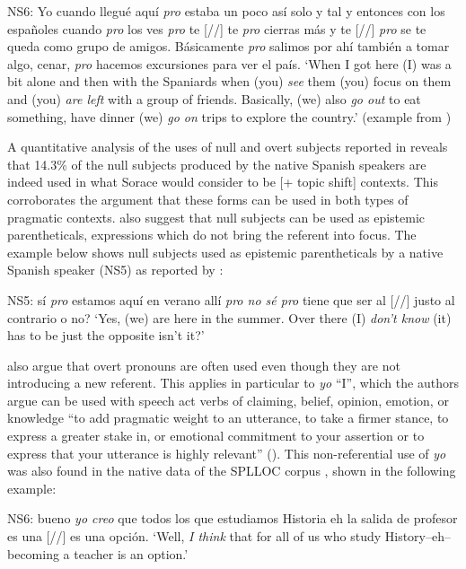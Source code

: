 \documentclass[output=paper]{langscibook}
\begin{document}
\ea\label{ex:dominguez:9}
NS6: Yo cuando llegué aquí \textit{pro} estaba un poco así solo y tal y entonces con los españoles  cuando \textit{pro} los ves  \textit{pro} te [//] te \textit{pro} cierras más y te [//] \textit{pro} se te queda como grupo de amigos. Básicamente \textit{pro} salimos por ahí también a tomar algo, cenar, \textit{pro} hacemos excursiones para ver el país.
\glt ‘When I got here (I) was a bit alone and then with the Spaniards when (you) \textit{see} them (you) focus on them and (you) \textit{are left} with a group of friends. Basically, (we) also \textit{go out} to eat something, have dinner (we) \textit{go on} trips to explore the country.’ (example from \citealt{Dominguez2013})
\z

A quantitative analysis of the uses of null and overt subjects reported in \citet{Dominguez2013} reveals that 14.3\% of the null subjects produced by the native Spanish speakers are indeed used in what Sorace would consider to be [+ topic shift] contexts. This corroborates the argument that these forms can be used in both types of pragmatic contexts. \citet{LubbersBlackwell2009} also suggest that null subjects can be used as epistemic parentheticals, expressions which do not bring the referent into focus. The example below shows null subjects used as epistemic parentheticals by a native Spanish speaker (NS5) as reported by \citet{Dominguez2013}:

\ea%
    \label{ex:dominguez:10}
NS5: sí \textit{pro} estamos aquí en verano allí \textit{pro no sé pro} tiene que ser al [//] justo al contrario o no?
\glt ‘Yes, (we) are here in the summer. Over there (I) \textit{don’t know} (it) has to be just the opposite isn’t it?’
\z

\citet{LubbersBlackwell2009} also argue that overt pronouns are often used even though they are not introducing a new referent.  This applies in particular to \textit{yo} ``I'', which the authors argue can be used with speech act verbs of claiming, belief, opinion, emotion, or knowledge ``to add pragmatic weight to an utterance, to take a firmer stance, to express a greater stake in, or emotional commitment to your assertion or to express that your utterance is highly relevant'' (\citealt[122]{LubbersBlackwell2009}). This non-referential use of \textit{yo} was also found in the native data of the SPLLOC corpus \citet{Dominguez2013}, shown in the following example:

\ea%
    \label{ex:dominguez:11}
NS6: bueno \textit{yo creo} que todos los que estudiamos Historia eh la salida de profesor es una [//] es una opción.
\glt ‘Well, \textit{I think} that for all of us who study History--eh--becoming a teacher is an option.’
\z
\end{document}
